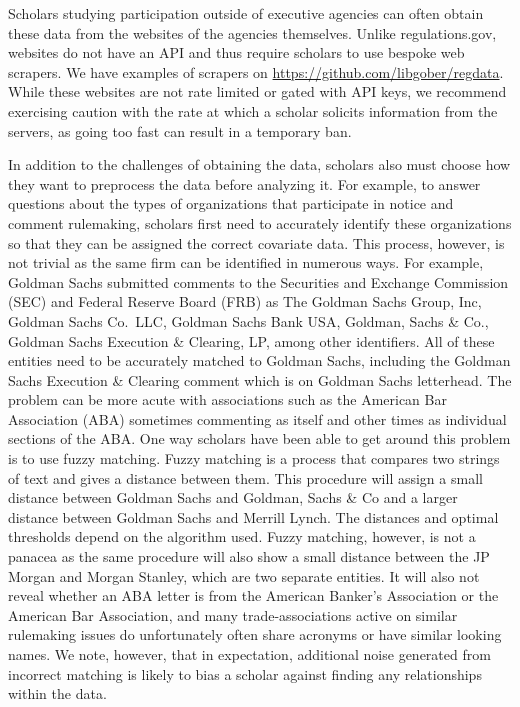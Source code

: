 \documentclass[12pt,notitlepage]{article}
\newcounter{cor}
\let\footnote=\endnote
\begin{document}
Scholars studying participation outside of executive agencies can often
obtain these data from the websites of the agencies themselves. Unlike
regulations.gov, websites do not have an API and thus require scholars
to use bespoke web scrapers. We have examples of scrapers on
\url{https://github.com/libgober/regdata}. While these websites are not
rate limited or gated with API keys, we recommend exercising caution
with the rate at which a scholar solicits information from the servers,
as going too fast can result in a temporary ban.

In addition to the challenges of obtaining the data, scholars also must
choose how they want to preprocess the data before analyzing it. For
example, to answer questions about the types of organizations that
participate in notice and comment rulemaking, scholars first need to
accurately identify these organizations so that they can be assigned the
correct covariate data. This process, however, is not trivial as the
same firm can be identified in numerous ways. For example, Goldman Sachs
submitted comments to the Securities and Exchange Commission (SEC) and
Federal Reserve Board (FRB) as The Goldman Sachs Group, Inc, Goldman
Sachs Co.~LLC, Goldman Sachs Bank USA, Goldman, Sachs \& Co., Goldman
Sachs Execution \& Clearing, LP, among other identifiers. All of these
entities need to be accurately matched to Goldman Sachs, including the
Goldman Sachs Execution \& Clearing comment which is on Goldman Sachs
letterhead.\footnote{See
  \url{https://www.sec.gov/comments/s7-03-10/s70310-43.pdf}.} The
problem can be more acute with associations such as the American Bar
Association (ABA) sometimes commenting as itself and other times as
individual sections of the ABA. One way scholars have been able to get
around this problem is to use fuzzy matching. Fuzzy matching is a
process that compares two strings of text and gives a distance between
them. This procedure will assign a small distance between Goldman Sachs
and Goldman, Sachs \& Co and a larger distance between Goldman Sachs and
Merrill Lynch. The distances and optimal thresholds depend on the
algorithm used. Fuzzy matching, however, is not a panacea as the same
procedure will also show a small distance between the JP Morgan and
Morgan Stanley, which are two separate entities. It will also not reveal
whether an ABA letter is from the American Banker's Association or the
American Bar Association, and many trade-associations active on similar
rulemaking issues do unfortunately often share acronyms or have similar
looking names. We note, however, that in expectation, additional noise
generated from incorrect matching is likely to bias a scholar against
finding any relationships within the data.
\end{document}
